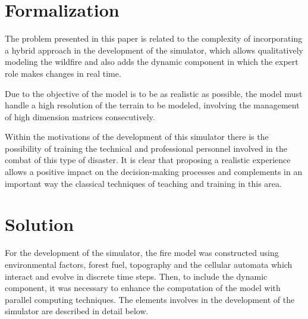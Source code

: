 \documentclass[conference]{IEEEtran}
\begin{document}
\section{Formalization}
    
    
    The problem presented in this paper is related to the complexity of incorporating a hybrid 
    approach in the development of the simulator, which allows qualitatively modeling the wildfire
    and also adds the dynamic component in which the expert role makes changes in real time.
    
    Due to the objective of the model is to be as realistic as possible, the model must handle a 
    high resolution of the terrain to be modeled, involving the management of high dimension matrices 
    consecutively.
    
    Within the motivations of the development of this simulator there is the possibility of 
    training the technical and professional personnel involved in the combat of this type of 
    disaster. It is clear that proposing a realistic experience allows a positive impact on the 
    decision-making processes and complements in an important way the classical techniques of 
    teaching and training in this area.

    

\section{Solution}

    For the development of the simulator, the fire model was constructed using 
    environmental factors, forest fuel, topography and the cellular automata which interact and evolve in 
    discrete time steps. Then, to include the dynamic component, it was necessary to enhance 
    the computation of the model with parallel computing techniques. The elements involves in the
    development of the simulator are described in detail below.
\end{document}
